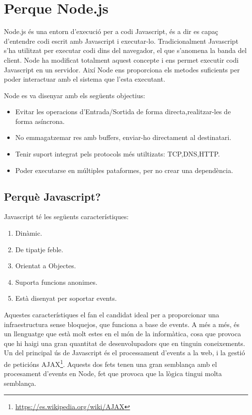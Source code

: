 \chapter{Perque Node.js}
\label{sec:node.js-full}

Node.js és una entorn d'execució per a codi Javascript, és a dir es capaç d'entendre codi escrit amb Javascript i executar-lo. Tradicionalment Javascript s'ha utilitzat per executar codi dins del navegador, el que s'anomena la banda del client. Node ha modificat totalment aquest concepte i ens permet executir codi Javascript en un servidor. Així Node ens proporciona els metodes suficients per poder interactuar amb el sistema que l'esta executant.

Node es va disenyar amb els següents objectius: 

\begin{itemize}
    \item{Evitar les operacions d'Entrada/Sortida de forma directa,realitzar-les de forma asíncrona.}
    \item{No emmagatzemar res amb buffers, enviar-ho directament al destinatari.}
    \item{Tenir suport integrat pels protocols més utiltizats: TCP,DNS,HTTP.}
    \item{Poder executarse en múltiples pataformes, per no crear una dependència.}
\end{itemize}

\section{Perquè Javascript?}

Javascript té les següents característiques: 

\begin{enumerate}
    \item{Dinàmic.}
    \item{De tipatje feble.}
    \item{Orientat a Objectes.}
    \item{Suporta funcions anonimes.}
    \item{Està disenyat per soportar events.}
\end{enumerate}

Aquestes característiques el fan el candidat ideal per a proporcionar una infraestructura sense bloquejos, que funciona a base de events. A més a més, és un llenguatge que està molt estes en el món de la informàtica, cosa que provoca que hi haigi una gran quantitat de desenvolupadors que en tinguin coneixements. Un del principal ús de Javascript és el processament d'events a la web, i la gestió de peticións AJAX\footnote{\url{https://es.wikipedia.org/wiki/AJAX}}. Aquests dos fets tenen una gran semblança amb el procesament d'events en Node, fet que provoca que la lògica tingui molta semblança.


